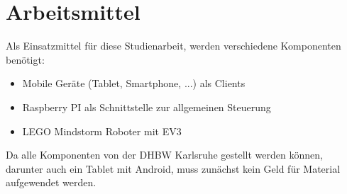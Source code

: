 \section{Arbeitsmittel}

Als Einsatzmittel für diese Studienarbeit, werden verschiedene Komponenten benötigt:

\begin{itemize}
	\item Mobile Geräte (Tablet, Smartphone, ...) als Clients
	\item Raspberry PI als Schnittstelle zur allgemeinen Steuerung
	\item LEGO Mindstorm Roboter mit EV3
\end{itemize}

\noindent
Da alle Komponenten von der DHBW Karlsruhe gestellt werden können, darunter auch ein Tablet mit Android, muss zunächst kein Geld für Material aufgewendet werden.